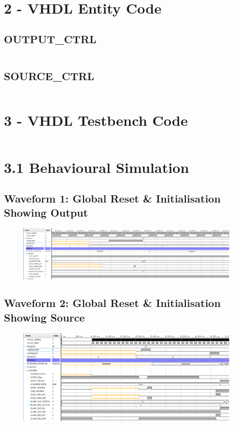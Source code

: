 \documentclass[11pt]{report}
\begin{document}
\section*{2 - VHDL Entity Code}
\subsection*{OUTPUT\_CTRL}
\inputminted{vhdl}{../../../DE_Project_T2/DE_Project_T2.srcs/sources_1/imports/DigEng_Proj_T2_model/SOURCE_CTRL.vhd}

\subsection*{SOURCE\_CTRL}
\inputminted{vhdl}{../../../DE_Project_T2/DE_Project_T2.srcs/sources_1/imports/DigEng_Proj_T2_model/OUTPUT_CTRL.vhd}


\section*{3 - VHDL Testbench Code}
\inputminted{vhdl}{../../../DE_Project_T2/DE_Project_T2.srcs/sim_1/imports/DigEng_Proj_T2_model/TOP_LEVEL_tb.vhd}

\section*{3.1 Behavioural Simulation}

\subsection*{Waveform 1: Global Reset \& Initialisation Showing Output}
\begin{figure}[H]
    \includegraphics[width=\columnwidth]{Assets/Output_Reset.png}
\end{figure}

\subsection*{Waveform 2: Global Reset \& Initialisation Showing Source}
\begin{figure}[H]
       \includegraphics[width=\columnwidth]{Assets/Source_Reset.png}
\end{figure}
\end{document}
